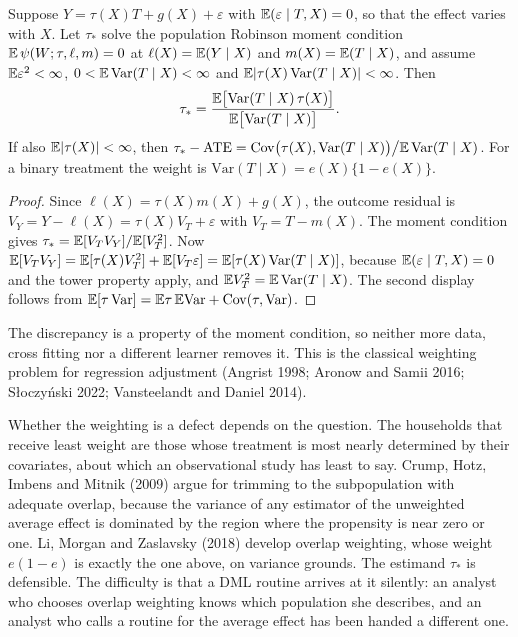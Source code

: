 \begin{proposition}\label{dml:prop:wate}
Suppose $Y = \tau(X)T + g(X) + \varepsilon$ with $\mathbb{E}(\varepsilon \mid T, X) = 0$, so that the effect varies with $X$. Let $\tau_*$ solve the population Robinson moment condition $\mathbb{E}\,\psi(W; \tau, \ell, m) = 0$ at $\ell(X) = \mathbb{E}(Y \mid X)$ and $m(X) = \mathbb{E}(T \mid X)$, and assume $\mathbb{E}\varepsilon^2 < \infty$, $0 < \mathbb{E}\,\mathrm{Var}(T \mid X) < \infty$ and $\mathbb{E}|\tau(X)\,\mathrm{Var}(T \mid X)| < \infty$. Then
\[
\tau_* = \frac{\mathbb{E}\bigl[\mathrm{Var}(T \mid X)\,\tau(X)\bigr]}{\mathbb{E}\bigl[\mathrm{Var}(T \mid X)\bigr]}.
\]
If also $\mathbb{E}|\tau(X)| < \infty$, then $\tau_* - \mathrm{ATE} = \mathrm{Cov}\bigl(\tau(X), \mathrm{Var}(T \mid X)\bigr)\big/\mathbb{E}\,\mathrm{Var}(T \mid X)$. For a binary treatment the weight is $\mathrm{Var}(T \mid X) = e(X)\{1 - e(X)\}$.
\end{proposition}

\begin{proof}
Since $\ell(X) = \tau(X)m(X) + g(X)$, the outcome residual is $V_Y = Y - \ell(X) = \tau(X)V_T + \varepsilon$ with $V_T = T - m(X)$. The moment condition gives $\tau_* = \mathbb{E}[V_TV_Y]/\mathbb{E}[V_T^2]$. Now $\mathbb{E}[V_TV_Y] = \mathbb{E}[\tau(X)V_T^2] + \mathbb{E}[V_T\varepsilon] = \mathbb{E}[\tau(X)\,\mathrm{Var}(T \mid X)]$, because $\mathbb{E}(\varepsilon \mid T, X) = 0$ and the tower property apply, and $\mathbb{E} V_T^2 = \mathbb{E}\,\mathrm{Var}(T \mid X)$. The second display follows from $\mathbb{E}[\tau\,\mathrm{Var}] = \mathbb{E}\tau\,\mathbb{E}\mathrm{Var} + \mathrm{Cov}(\tau, \mathrm{Var})$.
\end{proof}

The discrepancy is a property of the moment condition, so neither more data, cross fitting nor a different learner removes it. This is the classical weighting problem for regression adjustment (Angrist 1998; Aronow and Samii 2016; S{\l}oczy\'nski 2022; Vansteelandt and Daniel 2014).

Whether the weighting is a defect depends on the question. The households that receive least weight are those whose treatment is most nearly determined by their covariates, about which an observational study has least to say. Crump, Hotz, Imbens and Mitnik (2009) argue for trimming to the subpopulation with adequate overlap, because the variance of any estimator of the unweighted average effect is dominated by the region where the propensity is near zero or one. Li, Morgan and Zaslavsky (2018) develop overlap weighting, whose weight $e(1 - e)$ is exactly the one above, on variance grounds. The estimand $\tau_*$ is defensible. The difficulty is that a DML routine arrives at it silently: an analyst who chooses overlap weighting knows which population she describes, and an analyst who calls a routine for the average effect has been handed a different one.

